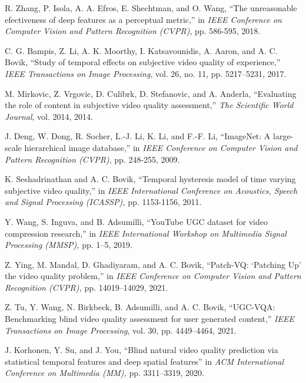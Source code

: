 \documentclass[journal]{IEEEtran}
\begin{document}
\begin{thebibliography}{5}
R. Zhang, P. Isola, A. A. Efros, E. Shechtman, and O. Wang, ``The unreasonable efectiveness of deep features as a perceptual metric,'' in \emph{IEEE Conference on Computer Vision and Pattern Recognition (CVPR)}, pp. 586-595, 2018.

C. G. Bampis, Z. Li, A. K. Moorthy, I. Katsavounidis, A. Aaron, and A. C. Bovik, ``Study of temporal effects on subjective video quality of experience,'' \emph{IEEE Transactions on Image Processing}, vol. 26, no. 11, pp. 5217–5231, 2017.

M. Mirkovic, Z. Vrgovic, D. Culibrk, D. Stefanovic, and A. Anderla, ``Evaluating the role of content in subjective video quality assessment,'' \emph{The Scientific World Journal}, vol. 2014, 2014.





J. Deng, W. Dong, R. Socher, L.-J. Li, K. Li, and  F.-F. Li, ``ImageNet: A large-scale hierarchical image database,'' in \emph{IEEE Conference on Computer Vision and Pattern Recognition (CVPR)}, pp. 248-255, 2009.





K. Seshadrinathan and A. C. Bovik, ``Temporal hysteresis model of time varying subjective video quality,'' in \emph{IEEE International Conference on Acoustics, Speech and Signal Processing (ICASSP),} pp. 1153-1156, 2011.

Y. Wang, S. Inguva, and B. Adsumilli, ``YouTube UGC dataset for video compression research,'' in \emph{IEEE International Workshop on Multimedia Signal Processing (MMSP),} pp. 1–5, 2019.

Z. Ying, M. Mandal, D. Ghadiyaram, and A. C. Bovik, ``Patch-VQ: ‘Patching Up’ the video quality problem,'' in \emph{IEEE Conference on Computer Vision and Pattern Recognition (CVPR),}  pp. 14019–14029, 2021.

Z. Tu, Y. Wang, N. Birkbeck, B. Adsumilli, and A. C. Bovik, ``UGC-VQA: Benchmarking blind video quality assessment for user generated content,'' \emph{IEEE Transactions on Image Processing}, vol. 30, pp. 4449–4464, 2021.

J. Korhonen, Y. Su, and J. You, ``Blind natural video quality prediction via statistical temporal features and deep spatial features'' in \emph{ACM International Conference on Multimedia (MM),} pp. 3311–3319, 2020.


\end{thebibliography}
\end{document}
